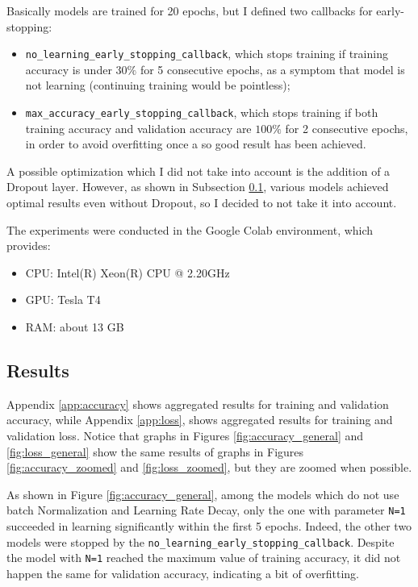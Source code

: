 \documentclass{article}
\begin{document}
\noindent Basically models are trained for 20 epochs, but I defined two callbacks for early-stopping:
\begin{itemize}
    \item \texttt{no\_learning\-\_early\_stopping\_callback}, which stops training if training accuracy is under $30\%$ for 5 consecutive epochs, as a symptom that model is not learning (continuing training would be pointless);
    \item \texttt{max\_accuracy\-\_early\-\_stopping\-\_callback}, which stops training if both training accuracy and validation accuracy are $100\%$ for 2 consecutive epochs, in order to avoid overfitting once a so good result has been achieved.
\end{itemize}

\noindent A possible optimization which I did not take into account is the addition of a Dropout layer.
However, as shown in Subsection \ref{results}, various models achieved optimal results even without Dropout, so I decided to not take it into account.

The experiments were conducted in the Google Colab environment, which provides:
\begin{itemize}
    \item CPU: Intel(R) Xeon(R) CPU @ 2.20GHz
    \item GPU: Tesla T4
    \item RAM: about 13 GB
\end{itemize}

\subsection{Results}
\label{results}
Appendix \ref{app:accuracy} shows aggregated results for training and validation accuracy, while Appendix \ref{app:loss}, shows aggregated results for training and validation loss.
Notice that graphs in Figures \ref{fig:accuracy_general} and \ref{fig:loss_general} show the same results of graphs in Figures \ref{fig:accuracy_zoomed} and \ref{fig:loss_zoomed}, but they are zoomed when possible.

As shown in Figure \ref{fig:accuracy_general}, among the models which do not use batch Normalization and Learning Rate Decay, only the one with parameter \texttt{N=1} succeeded in learning significantly within the first 5 epochs.
Indeed, the other two models were stopped by the
\texttt{no\_learning\-\_early\_stopping\_callback}.
Despite the model with \texttt{N=1} reached the maximum value of training accuracy, it did not happen the same for validation accuracy, indicating a bit of overfitting.
\end{document}
